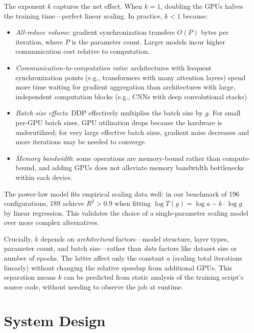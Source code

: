 \documentclass[letterpaper,10pt]{article}
\begin{document}
The exponent $k$ captures the net effect. When $k = 1$, doubling the GPUs halves the training time---perfect linear scaling. In practice, $k < 1$ because:
\begin{itemize}
    \item \textit{All-reduce volume}: gradient synchronization transfers $O(P)$ bytes per iteration, where $P$ is the parameter count. Larger models incur higher communication cost relative to computation.
    \item \textit{Communication-to-computation ratio}: architectures with frequent synchronization points (e.g., transformers with many attention layers) spend more time waiting for gradient aggregation than architectures with large, independent computation blocks (e.g., CNNs with deep convolutional stacks).
    \item \textit{Batch size effects}: DDP effectively multiplies the batch size by $g$. For small per-GPU batch sizes, GPU utilization drops because the hardware is underutilized; for very large effective batch sizes, gradient noise decreases and more iterations may be needed to converge.
    \item \textit{Memory bandwidth}: some operations are memory-bound rather than compute-bound, and adding GPUs does not alleviate memory bandwidth bottlenecks within each device.
\end{itemize}

The power-law model fits empirical scaling data well: in our benchmark of 196 configurations, 189 achieve $R^2 > 0.9$ when fitting $\log T(g) = \log a - k \cdot \log g$ by linear regression. This validates the choice of a single-parameter scaling model over more complex alternatives.

Crucially, $k$ depends on \textit{architectural} factors---model structure, layer types, parameter count, and batch size---rather than \textit{data} factors like dataset size or number of epochs. The latter affect only the constant $a$ (scaling total iterations linearly) without changing the relative speedup from additional GPUs. This separation means $k$ can be predicted from static analysis of the training script's source code, without needing to observe the job at runtime.

\section{System Design}
\label{sec:design}
\end{document}
